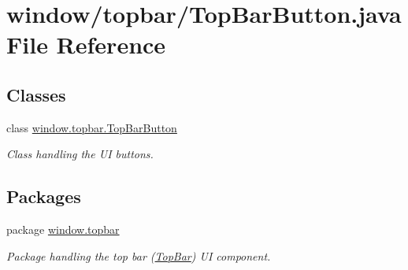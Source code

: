 \hypertarget{a00055}{\section{window/topbar/\-Top\-Bar\-Button.java File Reference}
\label{a00055}
}
\subsection*{Classes}
\begin{DoxyCompactItemize}
\item 
class \hyperlink{a00032}{window.\-topbar.\-Top\-Bar\-Button}
\begin{DoxyCompactList}\small\item\em Class handling the U\-I buttons. \end{DoxyCompactList}\end{DoxyCompactItemize}
\subsection*{Packages}
\begin{DoxyCompactItemize}
\item 
package \hyperlink{a00087}{window.\-topbar}
\begin{DoxyCompactList}\small\item\em Package handling the top bar (\hyperlink{a00031}{Top\-Bar}) U\-I component. \end{DoxyCompactList}\end{DoxyCompactItemize}
